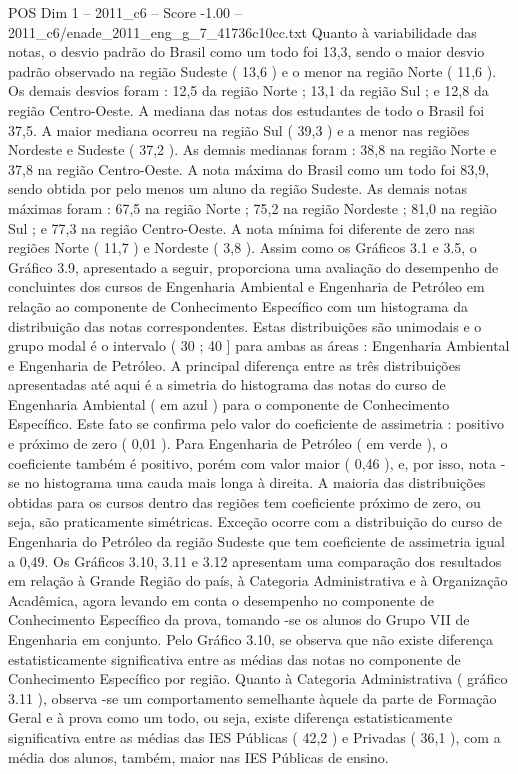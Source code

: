 \begin{textsample}{POS Dim 1 – 2011\_c6 – Score -1.00 – 2011\_c6/enade\_2011\_eng\_g\_7\_41736c10cc.txt}
Quanto à variabilidade das notas, o desvio padrão do Brasil como um todo foi 13,3, sendo o maior desvio padrão observado na região Sudeste ( 13,6 ) e o menor na região Norte ( 11,6 ).
Os demais desvios foram : 12,5 da região Norte ; 13,1 da região Sul ; e 12,8 da região Centro-Oeste.
A mediana das notas dos estudantes de todo o Brasil foi 37,5.
A maior mediana ocorreu na região Sul ( 39,3 ) e a menor nas regiões Nordeste e Sudeste ( 37,2 ).
As demais medianas foram : 38,8 na região Norte e 37,8 na região Centro-Oeste.
A nota máxima do Brasil como um todo foi 83,9, sendo obtida por pelo menos um aluno da região Sudeste.
As demais notas máximas foram : 67,5 na região Norte ; 75,2 na região Nordeste ; 81,0 na região Sul ; e 77,3 na região Centro-Oeste.
A nota mínima foi diferente de zero nas regiões Norte ( 11,7 ) e Nordeste ( 3,8 ).
Assim como os Gráficos 3.1 e 3.5, o Gráfico 3.9, apresentado a seguir, proporciona uma avaliação do desempenho de concluintes dos cursos de Engenharia Ambiental e Engenharia de Petróleo em relação ao componente de Conhecimento Específico com um histograma da distribuição das notas correspondentes.
Estas distribuições são unimodais e o grupo modal é o intervalo ( 30 ; 40 ] para ambas as áreas : Engenharia Ambiental e Engenharia de Petróleo.
A principal diferença entre as três distribuições apresentadas até aqui é a simetria do histograma das notas do curso de Engenharia Ambiental ( em azul ) para o componente de Conhecimento Específico.
Este fato se confirma pelo valor do coeficiente de assimetria : positivo e próximo de zero ( 0,01 ).
Para Engenharia de Petróleo ( em verde ), o coeficiente também é positivo, porém com valor maior ( 0,46 ), e, por isso, nota -se no histograma uma cauda mais longa à direita.
A maioria das distribuições obtidas para os cursos dentro das regiões tem coeficiente próximo de zero, ou seja, são praticamente simétricas.
Exceção ocorre com a distribuição do curso de Engenharia do Petróleo da região Sudeste que tem coeficiente de assimetria igual a 0,49.
Os Gráficos 3.10, 3.11 e 3.12 apresentam uma comparação dos resultados em relação à Grande Região do país, à Categoria Administrativa e à Organização Acadêmica, agora levando em conta o desempenho no componente de Conhecimento Específico da prova, tomando -se os alunos do Grupo VII de Engenharia em conjunto.
Pelo Gráfico 3.10, se observa que não existe diferença estatisticamente significativa entre as médias das notas no componente de Conhecimento Específico por região.
Quanto à Categoria Administrativa ( gráfico 3.11 ), observa -se um comportamento semelhante àquele da parte de Formação Geral e à prova como um todo, ou seja, existe diferença estatisticamente significativa entre as médias das IES Públicas ( 42,2 ) e Privadas ( 36,1 ), com a média dos alunos, também, maior nas IES Públicas de ensino.

\end{textsample}
